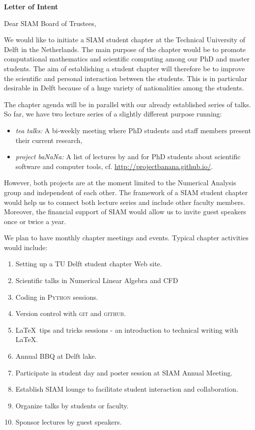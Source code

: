 \documentclass[letterpaper,12pt]{letter}
\begin{document}
\begin{letter}{\textbf{Letter of Intent}}

\opening{Dear SIAM Board of Trustees,}

We would like to initiate a SIAM student chapter at the Technical University of Delft in the Netherlands. The main purpose of the chapter would be to promote computational mathematics and scientific computing among our PhD and master students. The aim of establishing a student chapter will therefore be to improve the scientific and personal interaction between the students. This is in particular desirable in Delft because of a huge variety of nationalities among the students. 

The chapter agenda will be in parallel with our already established series of talks. So far, we have two lecture series of a slightly different purpose running:
\begin{itemize}
 \item \textit{tea talks:} A bi-weekly meeting where PhD students and staff members present their current research,
 \item \textit{project baNaNa:} A list of lectures by and for PhD students about scientific software and computer tools, cf. \href{http://projectbanana.github.io/}{http://projectbanana.github.io/}.
\end{itemize}
However, both projects are at the moment limited to the Numerical Analysis group and independent of each other. The framework of a SIAM student chapter would help us to connect both lecture series and include other faculty members. Moreover, the financial support of SIAM would allow us to invite guest speakers once or twice a year.

We plan to have monthly chapter meetings and events. Typical chapter activities would include:
\begin{enumerate}
\item Setting up a TU Delft student chapter Web site.
\item Scientific talks in Numerical Linear Algebra and CFD
\item Coding in \textsc{Python} sessions.
\newpage
\item Version control with \textsc{git} and \textsc{github}.
\item \LaTeX \ tips and tricks sessions - an introduction to technical writing with \LaTeX.
\item Annual BBQ at Delft lake.
\item Participate in student day and poster session at SIAM Annual Meeting.
\item Establish SIAM lounge to facilitate student interaction and collaboration.
\item Organize talks by students or faculty.
\item Sponsor lectures by guest speakers.
\end{enumerate}


\end{letter}
\end{document}

